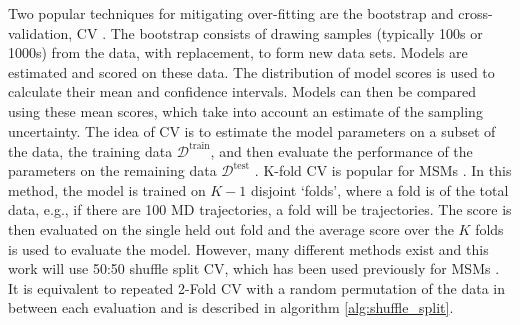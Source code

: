 Two popular techniques for mitigating over-fitting \cite{friedman2001elements} are the bootstrap \cite{efronIntroductionBootstrap1993} and cross-validation, CV \cite{arlotSurveyCrossvalidationProcedures2009}. The bootstrap consists of drawing samples (typically \num{100}s or \num{1000}s) from the data, with replacement, to form new data sets. Models are estimated and scored on these data. The distribution of model scores is used to calculate their mean and confidence intervals. Models can then be compared using these mean scores, which take into account an estimate of the sampling uncertainty. The idea of CV is to estimate the model parameters on a subset of the data, the training data $\mathcal{D}^{\mathrm{train}}$, and then evaluate the performance of the parameters on the remaining data $\mathcal{D}^{\mathrm{test}}$ \cite{friedman2001elements}. K-fold CV is popular for MSMs \cite{schererVariationalSelectionFeatures2019,mcgibbonVariationalCrossvalidationSlow2015}. In this method, the model is trained on $K-1$ disjoint `folds',  where a fold is  of the total data, e.g., if there are \num{100} MD trajectories, a fold will be  trajectories. The score is then evaluated on the single held out fold and the average score over the $K$ folds is used to evaluate the model. However, many different methods exist \cite{arlotSurveyCrossvalidationProcedures2009} and this work will use 50:50 shuffle split CV, which has been used previously for MSMs \cite{chenDynamicConformationalLandscape2019,husicOptimizedParameterSelection2016}. It is equivalent to repeated 2-Fold CV with a random permutation of the data in between each evaluation and is described in algorithm \ref{alg:shuffle_split}. 

